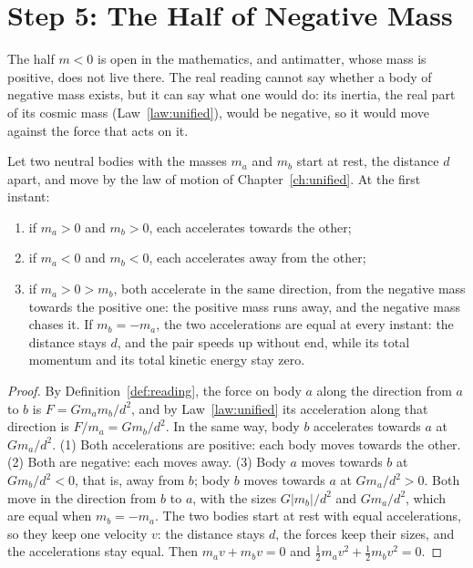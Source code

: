 \section{Step 5: The Half of Negative Mass}\label{sec:fa-negative}

The half $m < 0$ is open in the mathematics, and antimatter, whose mass is positive, does not live there. The real reading cannot say whether a body of negative mass exists, but it can say what one would do: its inertia, the real part of its cosmic mass (Law~\ref{law:unified}), would be negative, so it would move against the force that acts on it.

\begin{proposition}\label{prop:fa-negative}
Let two neutral bodies with the masses $m_a$ and $m_b$ start at rest, the distance $d$ apart, and move by the law of motion of Chapter~\ref{ch:unified}. At the first instant:
\begin{enumerate}
  \item if $m_a > 0$ and $m_b > 0$, each accelerates towards the other;
  \item if $m_a < 0$ and $m_b < 0$, each accelerates away from the other;
  \item if $m_a > 0 > m_b$, both accelerate in the same direction, from the negative mass towards the positive one: the positive mass runs away, and the negative mass chases it. If $m_b = -m_a$, the two accelerations are equal at every instant: the distance stays $d$, and the pair speeds up without end, while its total momentum and its total kinetic energy stay zero.
\end{enumerate}
\end{proposition}

\begin{proof}
By Definition~\ref{def:reading}, the force on body $a$ along the direction from $a$ to $b$ is $F = G m_a m_b/d^2$, and by Law~\ref{law:unified} its acceleration along that direction is $F/m_a = G m_b/d^2$. In the same way, body $b$ accelerates towards $a$ at $G m_a/d^2$. (1) Both accelerations are positive: each body moves towards the other. (2) Both are negative: each moves away. (3) Body $a$ moves towards $b$ at $G m_b/d^2 < 0$, that is, away from $b$; body $b$ moves towards $a$ at $G m_a/d^2 > 0$. Both move in the direction from $b$ to $a$, with the sizes $G|m_b|/d^2$ and $G m_a/d^2$, which are equal when $m_b = -m_a$. The two bodies start at rest with equal accelerations, so they keep one velocity $v$: the distance stays $d$, the forces keep their sizes, and the accelerations stay equal. Then $m_a v + m_b v = 0$ and $\tfrac{1}{2}m_a v^2 + \tfrac{1}{2}m_b v^2 = 0$.
\end{proof}

